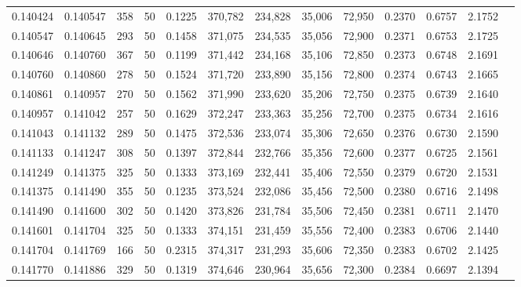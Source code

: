 \begin{tabular}{rrrrrrrrrrrrr}
0.140424 & 0.140547 &   358 &  50 &                                     0.1225 & 370,782 & 234,828 &  35,006 &  72,950 & 0.2370 & 0.6757 & 2.1752 \\
0.140547 & 0.140645 &   293 &  50 &                                     0.1458 & 371,075 & 234,535 &  35,056 &  72,900 & 0.2371 & 0.6753 & 2.1725 \\
0.140646 & 0.140760 &   367 &  50 &                                     0.1199 & 371,442 & 234,168 &  35,106 &  72,850 & 0.2373 & 0.6748 & 2.1691 \\
0.140760 & 0.140860 &   278 &  50 &                                     0.1524 & 371,720 & 233,890 &  35,156 &  72,800 & 0.2374 & 0.6743 & 2.1665 \\
0.140861 & 0.140957 &   270 &  50 &                                     0.1562 & 371,990 & 233,620 &  35,206 &  72,750 & 0.2375 & 0.6739 & 2.1640 \\
0.140957 & 0.141042 &   257 &  50 &                                     0.1629 & 372,247 & 233,363 &  35,256 &  72,700 & 0.2375 & 0.6734 & 2.1616 \\
0.141043 & 0.141132 &   289 &  50 &                                     0.1475 & 372,536 & 233,074 &  35,306 &  72,650 & 0.2376 & 0.6730 & 2.1590 \\
0.141133 & 0.141247 &   308 &  50 &                                     0.1397 & 372,844 & 232,766 &  35,356 &  72,600 & 0.2377 & 0.6725 & 2.1561 \\
0.141249 & 0.141375 &   325 &  50 &                                     0.1333 & 373,169 & 232,441 &  35,406 &  72,550 & 0.2379 & 0.6720 & 2.1531 \\
0.141375 & 0.141490 &   355 &  50 &                                     0.1235 & 373,524 & 232,086 &  35,456 &  72,500 & 0.2380 & 0.6716 & 2.1498 \\
0.141490 & 0.141600 &   302 &  50 &                                     0.1420 & 373,826 & 231,784 &  35,506 &  72,450 & 0.2381 & 0.6711 & 2.1470 \\
0.141601 & 0.141704 &   325 &  50 &                                     0.1333 & 374,151 & 231,459 &  35,556 &  72,400 & 0.2383 & 0.6706 & 2.1440 \\
0.141704 & 0.141769 &   166 &  50 &                                     0.2315 & 374,317 & 231,293 &  35,606 &  72,350 & 0.2383 & 0.6702 & 2.1425 \\
0.141770 & 0.141886 &   329 &  50 &                                     0.1319 & 374,646 & 230,964 &  35,656 &  72,300 & 0.2384 & 0.6697 & 2.1394 \\

\end{tabular}
